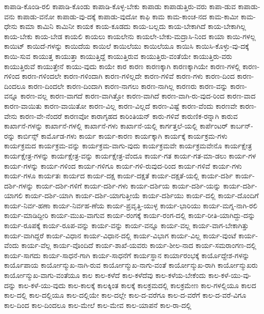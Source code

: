 {ಕಾಪಾಡಿ-ಕೊಂಡಿ-ರಲಿ
ಕಾಪಾಡಿ-ಕೊಂಡು
ಕಾಪಾಡಿ-ಕೊಳ್ಳ-ಬೇಕು
ಕಾಪಾಡು
ಕಾಪಾಡುತ್ತಿರು-ವರು
ಕಾಪಾ-ಡುವ
ಕಾಪಾಡು-ವನು
ಕಾಪಾಡು-ವನೋ
ಕಾಪಾಡು-ವು-ದಕ್ಕೆ
ಕಾಪಾಡು-ವುದೋ
ಕಾಫಿ
ಕಾಮ
ಕಾಮ-ಕಾಂಚ-ನದ
ಕಾಮ-ಕಾಮೀ
ಕಾಮ-ಧೇನು
ಕಾಮಾ
ಕಾಮಿನಿ
ಕಾಮಿನೀ
ಕಾಯಕ
ಕಾಯ-ಕೂಡದು
ಕಾಯ-ಬಲ್ಲದು
ಕಾಯ-ಬೇಕಾಗಿದೆ
ಕಾಯ-ಬೇಕಾಗಿಲ್ಲ
ಕಾಯ-ಬೇಕು
ಕಾಯ-ಬೇಡ
ಕಾಯಲಿ
ಕಾಯಲು
ಕಾಯಲೇನು
ಕಾಯಲೇ-ಬೇಕು-ಮದ್ರಾಸಿ-ನಿಂದ
ಕಾಯಾ
ಕಾಯಿ-ಗಳಲ್ಲ
ಕಾಯಿಟ್
ಕಾಯಿದೆ-ಗಳನ್ನು
ಕಾಯಿದೆಯ
ಕಾಯಿಲೆ
ಕಾಯಿಲೆಯು
ಕಾಯಿಲೆಯೂ
ಕಾಯಿಸಿ
ಕಾಯಿಸಿ-ಕೊಳ್ಳು-ವು-ದಕ್ಕೆ
ಕಾಯಿ-ಸುವ
ಕಾಯುತ್ತ
ಕಾಯುತ್ತಾ
ಕಾಯುತ್ತಿದ್ದೆ
ಕಾಯುತ್ತಿರುವ
ಕಾಯುತ್ತಿರು-ವಂತೆಯೇ
ಕಾಯುತ್ತಿರು-ವರು
ಕಾಯುತ್ತಿರುವೆ
ಕಾಯುತ್ತೇನೆ
ಕಾಯು-ವುದು
ಕಾಯೇ
ಕಾರ
ಕಾರಣ
ಕಾರಣಕ್ಕಾಗಿ
ಕಾರಣಕ್ಕಾಗಿಯೇ
ಕಾರಣ-ಗಳಲ್ಲಿ
ಕಾರಣ-ಗಳಿಂದ
ಕಾರಣ-ಗಳಿಂದಲೇ
ಕಾರಣ-ಗಳಿಂದಾಗಿ
ಕಾರಣ-ಗಳಿಲ್ಲದೇ
ಕಾರಣ-ಗಳಿವೆ
ಕಾರಣ-ಗಳು
ಕಾರಣ-ದಿಂದ
ಕಾರಣ-ದಿಂದಲೂ
ಕಾರಣ-ದಿಂದಲೇ
ಕಾರಣ-ದಿಂದಾಗಿ
ಕಾರಣ-ನಾಗಲು
ಕಾರಣ-ನಾಗಿಲ್ಲ
ಕಾರಣರು
ಕಾರಣ-ವನ್ನು
ಕಾರಣ-ವನ್ನೂ
ಕಾರಣ-ವಲ್ಲ
ಕಾರಣ-ವಾಗದೆ
ಕಾರಣ-ವಾಗಿತ್ತೋ
ಕಾರಣ-ವಾಗಿದೆ
ಕಾರಣ-ವಾಗಿ-ರು-ವುದ-ರಿಂದ
ಕಾರಣ-ವಾದ
ಕಾರಣ-ವಾಯಿತು
ಕಾರಣ-ವಾಯಿತೋ
ಕಾರಣ-ವಿಲ್ಲ
ಕಾರಣ-ವಿಲ್ಲದೆ
ಕಾರಣ-ವಿಷ್ಟೆ
ಕಾರಣ-ವೆಂದು
ಕಾರಣವೇ
ಕಾರಣ-ವೇನು
ಕಾರಣ-ವೇ-ನೆಂದರೆ
ಕಾರಣವೋ
ಕಾರಾಗೃಹದ
ಕಾರಿಂತಿಯನ್
ಕಾರು-ಗಳಿವೆ
ಕಾರುಣಿಕ-ರನ್ನಾಗಿ
ಕಾರುವ
ಕಾರ್ಖಾನೆ-ಗಳನ್ನು
ಕಾರ್ಖಾನೆ-ಗಳಲ್ಲಿ
ಕಾರ್ಖಾನೆ-ಗಳು
ಕಾರ್ಖಾನೆ-ಯಲ್ಲಿ
ಕಾರ್ಗತ್ತಲೆ-ಯಲ್ಲಿ
ಕಾರ್ಪೆಂಟರ್
ಕಾರ್ಬನ್-ರನ್ನು
ಕಾರ್ಬಿನ್ಸ್
ಕಾರ್ಮೊಡ-ಗಳು
ಕಾರ್ಯ
ಕಾರ್ಯ-ಕಾರಣ
ಕಾರ್ಯಕ್ಕಾಗಿ
ಕಾರ್ಯಕ್ಕೆ
ಕಾರ್ಯಕ್ರಮ-ಗಳು
ಕಾರ್ಯಕ್ರಮದ
ಕಾರ್ಯಕ್ರಮ-ವನ್ನು
ಕಾರ್ಯಕ್ರಮ-ವಾಗು-ವುದು
ಕಾರ್ಯಕ್ರಮವೇ
ಕಾರ್ಯಕ್ರಮವೇನೊ
ಕಾರ್ಯಕ್ಷೇತ್ರ
ಕಾರ್ಯಕ್ಷೇತ್ರ-ಗಳನ್ನು
ಕಾರ್ಯಕ್ಷೇತ್ರ-ವನ್ನು
ಕಾರ್ಯಕ್ಷೇತ್ರ-ವೆಂದೂ
ಕಾರ್ಯ-ಗತ
ಕಾರ್ಯ-ಗತ-ಮಾ-ಡಲು
ಕಾರ್ಯ-ಗಳ
ಕಾರ್ಯ-ಗಳನ್ನು
ಕಾರ್ಯ-ಗಳಿಂದ
ಕಾರ್ಯ-ಗಳಿಗೂ
ಕಾರ್ಯ-ಗಳಿ-ರುವುದ-ರಿಂದ
ಕಾರ್ಯ-ಗಳಿವೆ
ಕಾರ್ಯ-ಗಳು
ಕಾರ್ಯ-ಗಳೂ
ಕಾರ್ಯತಃ
ಕಾರ್ಯದ
ಕಾರ್ಯ-ದಕ್ಷ
ಕಾರ್ಯ-ದಕ್ಷತೆ
ಕಾರ್ಯ-ದಕ್ಷತೆ-ಯಲ್ಲಿ
ಕಾರ್ಯ-ದರ್ಶಿ
ಕಾರ್ಯ-ದರ್ಶಿ-ಗಳನ್ನು
ಕಾರ್ಯ-ದರ್ಶಿ-ಗಳಿಗೆ
ಕಾರ್ಯ-ದರ್ಶಿ-ಗಳು
ಕಾರ್ಯ-ದರ್ಶಿಯ
ಕಾರ್ಯ-ದರ್ಶಿ-ಯನ್ನು
ಕಾರ್ಯ-ದರ್ಶಿ-ಯಾಗಲಿ
ಕಾರ್ಯ-ದರ್ಶಿ-ಯಾಗಿ
ಕಾರ್ಯ-ದರ್ಶಿ-ಯಾಗುತ್ತೀಯೆ
ಕಾರ್ಯ-ದರ್ಶಿಯು
ಕಾರ್ಯ-ದಲ್ಲಿ
ಕಾರ್ಯ-ದೊಂದಿಗೆ
ಕಾರ್ಯ-ನಿರ್ವ-ಹಣಾ
ಕಾರ್ಯ-ನಿರ್ವಹ-ಣೆಯ
ಕಾರ್ಯ-ಪ್ರವೃತ್ತಿ-ಯುಳ್ಳ
ಕಾರ್ಯ-ಭಾರಿಯು
ಕಾರ್ಯ-ಮಗ್ನ-ನಾಗಿ-ರಲಿ
ಕಾರ್ಯ-ಮಾಡಿದ್ದೀರಿ
ಕಾರ್ಯ-ಮುಖ-ವಾಗುವ
ಕಾರ್ಯ-ರಂಗಕ್ಕೆ
ಕಾರ್ಯ-ರಂಗ-ದಲ್ಲಿ
ಕಾರ್ಯ-ರೀತಿ-ಯಾಗಿದ್ದು-ದನ್ನು
ಕಾರ್ಯ-ರೂಪಕ್ಕೆ
ಕಾರ್ಯ-ರೂಪ-ವನ್ನು
ಕಾರ್ಯ-ವನ್ನು
ಕಾರ್ಯ-ವನ್ನೂ
ಕಾರ್ಯ-ವಲ್ಲ
ಕಾರ್ಯ-ವಾಗ-ಬೇಕಾಗಿತ್ತು
ಕಾರ್ಯ-ವಾಗಿದ್ದರೆ
ಕಾರ್ಯ-ವಿಧಾನ
ಕಾರ್ಯ-ವಿಧಾನ-ದಲ್ಲಿ
ಕಾರ್ಯ-ವಿಭಾಗ
ಕಾರ್ಯ-ವಿಲ್ಲ
ಕಾರ್ಯ-ವುಂಟೆ
ಕಾರ್ಯ-ವೆಂದು
ಕಾರ್ಯ-ವೆಲ್ಲ
ಕಾರ್ಯ-ವೊಂದಿದೆ
ಕಾರ್ಯ-ಶಾಖೆ-ಯವರು
ಕಾರ್ಯ-ಶೀಲ-ನಾದ
ಕಾರ್ಯ-ಸಮರಾಂಗಣ-ದಲ್ಲಿ
ಕಾರ್ಯ-ಸಾಗದು
ಕಾರ್ಯ-ಸಾಧನೆ-ಗಾಗಿ
ಕಾರ್ಯ-ಸಾಧನೆಗೆ
ಕಾರ್ಯಸ್ಥಾನ
ಕಾರ್ಯಾರಂಭಕ್ಕೆ
ಕಾರ್ಯೊದ್ದೇಶ-ಗಳನ್ನು
ಕಾರ್ಯೊಪಾಯ
ಕಾರ್ಯೋನ್ಮುಖ-ನಾಗಿ-ರುವ
ಕಾರ್ಯೋನ್ಮುಖ-ನಾಗು-ವಂತೆ
ಕಾರ್ಯೋನ್ಮುಖ-ರಾಗಿ
ಕಾರ್ಯೋನ್ಮುಖರು
ಕಾರ್ಯೋನ್ಮುಖ-ವಾಗು-ವಂತೆಯೂ
ಕಾಲ
ಕಾಲ-ಕಳೆದೆ
ಕಾಲ-ಕಳೆದೆವು
ಕಾಲ-ಕಳೆಯ-ಬೇಕೆಂದು
ಕಾಲ-ಕಳೆ-ಯು-ವು-ದನ್ನು
ಕಾಲ-ಕಳೆ-ಯು-ವುದು
ಕಾಲ-ಕಾಲಕ್ಕೆ
ಕಾಲಕ್ಕಿಂತ
ಕಾಲಕ್ಕೆ
ಕಾಲಕ್ರಮದಲ್ಲಿ
ಕಾಲಕ್ರಮೇಣ
ಕಾಲ-ಗಳಲ್ಲಿಯೂ
ಕಾಲದ
ಕಾಲ-ದಲ್ಲಿ
ಕಾಲ-ದಲ್ಲಿಯೂ
ಕಾಲ-ದಲ್ಲಿಯೇ
ಕಾಲ-ದಲ್ಲೇ
ಕಾಲ-ದ-ವರೆಗೂ
ಕಾಲ-ದ-ವರೆಗೆ
ಕಾಲ-ದ-ವರೆ-ವಿಗೂ
ಕಾಲ-ದಿಂದ
ಕಾಲ-ದಿಂದಲೂ
ಕಾಲ-ಮೇಲೆ
ಕಾಲ-ಮೇವ
ಕಾಲ-ಯಾಪನೆ
ಕಾಲ-ರಾ-ದಲ್ಲಿ
}
